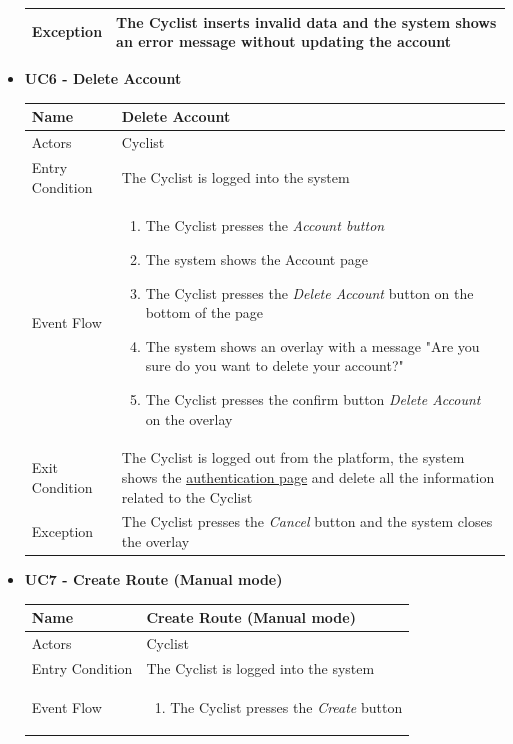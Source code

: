 \begin{itemize}
\begin{tabular}{|p{7cm}|p{7cm}|}
Exception       & The Cyclist inserts invalid data and the system shows an error message without updating the account
\\ \hline
\end{tabular}
\bigskip
\item \textbf{UC6 - Delete Account}\par\smallskip
\noindent
\begin{tabular}{|p{7cm}|p{7cm}|}
\hline
Name            & Delete  Account \\ \hline
Actors          & Cyclist \\ \hline
Entry Condition & The Cyclist is logged into the system \\ \hline
Event Flow      &
\begin{enumerate}
    \item The Cyclist presses the \textit{Account button}
    \item The system shows the Account page
    \item The Cyclist presses the  \textit{Delete Account} button on the bottom of the page
    \item The system shows an overlay with a message "Are you sure do you want to delete your account?"
    \item The Cyclist presses the confirm button \textit{Delete Account} on the overlay
\end{enumerate}
\\ \hline
Exit Condition  & The Cyclist is logged out from the platform, the system shows the  \hyperref[fig:LoginSignUp]{authentication page} and delete all the information related to the Cyclist \\ \hline
Exception       & The Cyclist presses the \textit{Cancel} button and the system closes the overlay
\\ \hline
\end{tabular}
\newpage
\item \textbf{UC7 - Create Route (Manual mode)}\par\smallskip
\noindent
\begin{tabular}{|p{7cm}|p{7cm}|}
\hline
Name            & Create Route (Manual mode) \\ \hline
Actors          & Cyclist \\ \hline
Entry Condition & The Cyclist is logged into the system \\ \hline
Event Flow      &
\begin{enumerate}
    \item The Cyclist presses the \textit{Create} button

\end{enumerate}
\end{tabular}
\end{itemize}
